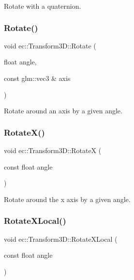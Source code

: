 Rotate with a quaternion. \mbox{\label{classec_1_1_transform3_d_acaaea3ccdff9e23f1edf6f9fed054afe}} 
\subsubsection{\texorpdfstring{Rotate()}{Rotate()}\hspace{0.1cm}{\footnotesize\ttfamily [2/2]}}
{\footnotesize\ttfamily void ec\+::\+Transform3\+D\+::\+Rotate (\begin{DoxyParamCaption}\item[{float}]{angle,  }\item[{const glm\+::vec3 \&}]{axis }\end{DoxyParamCaption})}

Rotate around an axis by a given angle. \mbox{\label{classec_1_1_transform3_d_a04e4eaf695ba795bac09e8fa43c0a462}} 
\subsubsection{\texorpdfstring{Rotate\+X()}{RotateX()}}
{\footnotesize\ttfamily void ec\+::\+Transform3\+D\+::\+RotateX (\begin{DoxyParamCaption}\item[{const float}]{angle }\end{DoxyParamCaption})}

Rotate around the x axis by a given angle. \mbox{\label{classec_1_1_transform3_d_af5995f2c01e062a715f8a3181dd11f04}} 
\subsubsection{\texorpdfstring{Rotate\+X\+Local()}{RotateXLocal()}}
{\footnotesize\ttfamily void ec\+::\+Transform3\+D\+::\+Rotate\+X\+Local (\begin{DoxyParamCaption}\item[{const float}]{angle }\end{DoxyParamCaption})}

